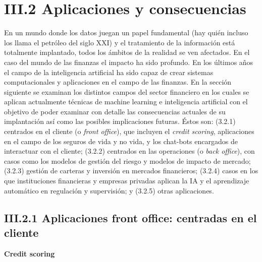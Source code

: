 \documentclass[]{DissertateUSU}
\begin{document}
\FloatBarrier
{}
\fancyfoot[C]{\thepage}

\section{III.2 \textbf{Aplicaciones y consecuencias}}

\noindent En un mundo donde los datos juegan un papel fundamental (hay
quién incluso los llama el petróleo del siglo XXI) y el tratamiento de
la información está totalmente implantado, todos los ámbitos de la
realidad se ven afectados. En el caso del mundo de las finanzas el
impacto ha sido profundo. En los últimos años el campo de la
inteligencia artificial ha sido capaz de crear sistemas computacionales
y aplicaciones en el campo de las finanzas. En la sección siguiente se
examinan los distintos campos del sector financiero en los cuales se
aplican actualmente técnicas de machine learning e inteligencia
artificial con el objetivo de poder examinar con detalle las
consecuencias actuales de su implantación así como las posibles
implicaciones futuras. Éstos son: (3.2.1) centrados en el cliente (o
\emph{front office}), que incluyen el \emph{credit scoring},
aplicaciones en el campo de los seguros de vida y no vida, y los
chat-bots encargados de interactuar con el cliente; (3.2.2) centrados en
las operaciones (o \emph{back office}), con casos como los modelos de
gestión del riesgo y modelos de impacto de mercado; (3.2.3) gestión de
carteras y inversión en mercados financieros; (3.2.4) casos en los que
instituciones financieras y empresas privadas aplican la IA y el
aprendizaje automático en regulación y supervisión; y (3.2.5) otras
aplicaciones.

\justifying

\FloatBarrier
{}
\fancyfoot[C]{\thepage}

\subsection{III.2.1 \textbf{Aplicaciones front office: centradas en el cliente}}

\justifying

\textbf{Credit scoring}
\end{document}

